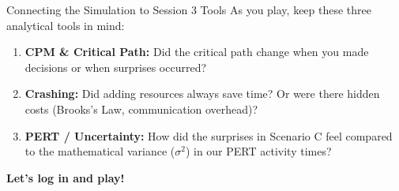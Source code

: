 \documentclass[11pt,aspectratio=169]{beamer}
\begin{document}
\begin{frame}{Connecting the Simulation to Session 3 Tools}
    As you play, keep these three analytical tools in mind:
    \vspace{1em}
    \begin{enumerate}[<+->]
        \item \textbf{CPM \& Critical Path:} Did the critical path change when you made decisions or when surprises occurred?
        \item \textbf{Crashing:} Did adding resources always save time? Or were there hidden costs (Brooks's Law, communication overhead)?
        \item \textbf{PERT / Uncertainty:} How did the surprises in Scenario C feel compared to the mathematical variance ($\sigma^2$) in our PERT activity times?
    \end{enumerate}
    \vspace{1em}
    \pause
    \begin{center}
        \Large \textbf{Let's log in and play!}
    \end{center}
\end{frame}
\end{document}
